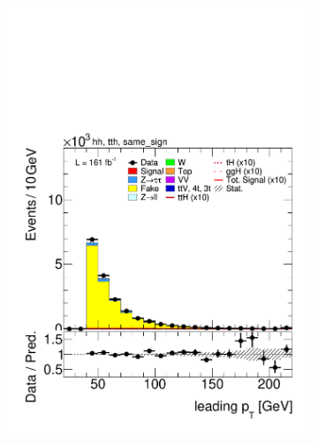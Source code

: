   \begin{figure}[htbp]
    \centering
    \begin{subfigure}[b]{0.45\textwidth}
      \centering
      \includegraphics[width=\textwidth]{images/fakes_run3/plot_tau_0_pt_hh_tth_22_23_24_same_sign.pdf}
      \caption{}
    \end{subfigure}
    \hfill
    \begin{subfigure}[b]{0.45\textwidth}
      \centering

\end{subfigure}
\end{figure}
